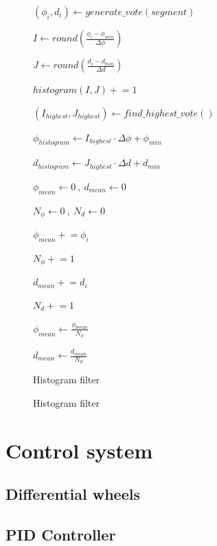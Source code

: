 \documentclass{article}
\begin{document}
\begin{figure} [ht]
\begin{algorithm}[H]
	 {
			$(\phi_i, d_i) \gets generate\_vote(segment)$
			
			$I \gets round(\frac{\phi_i - \phi_{min}}{\Delta\phi})$

			$J \gets round(\frac{d_i - d_{min}}{\Delta d})$
			
			$histogram(I, J) \mathrel{+}= 1$
	}
	
	$(I_{highest}, J_{highest}) \gets find \_ highest \_ vote()$	
	
	$\phi_{histogram} \gets I_{highest} \cdot \Delta \phi + \phi_{min}$
	
	$d_{histogram} \gets J_{highest} \cdot \Delta d + d_{min}$

	$\phi_{mean} \gets 0 \ , \  d_{mean} \gets 0$
	
	$N_{\phi} \gets 0 \ , \ N_{d} \gets 0$
	
	{
		{
			$\phi_{mean} \mathrel{+}= \phi_{i}$
			
			$N_{\phi} \mathrel{+}= 1$
		}
		
		{
			$d_{mean} \mathrel{+}= d_{i}$
			
			$N_{d} \mathrel{+}= 1$
		}
	}
	
	$\phi_{mean} \gets \frac{\phi_{mean}}{N_{\phi}}$
	
	$d_{mean} \gets \frac{d_{mean}}{N_{d}}$	
	\caption{Histogram filter}
\end{algorithm}
\caption{Histogram filter}
\end{figure}
\FloatBarrier

\clearpage

\section{Control system}

\subsection{Differential wheels}

\subsection{PID Controller}
\end{document}
